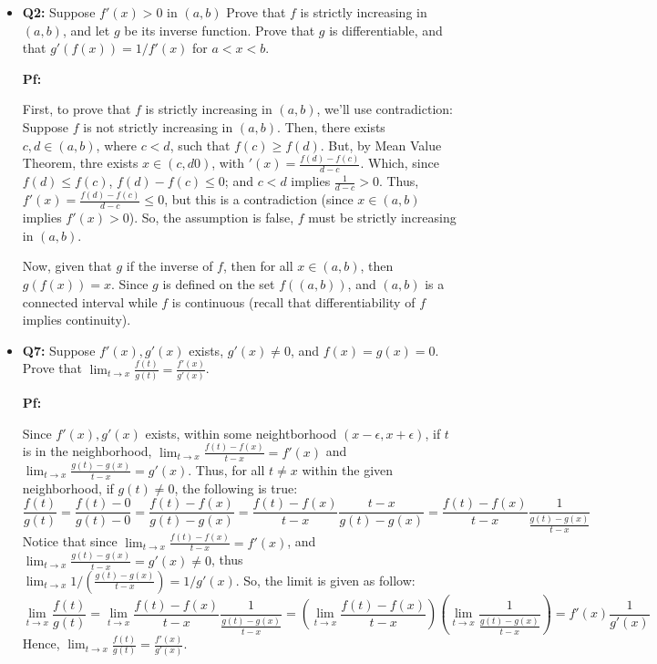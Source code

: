 \documentclass{article}
\begin{document}
\hfill

\begin{itemize}
    \item \begin{myBox}[]{}
        \textbf{Q2:} Suppose $f'(x)>0$ in $(a,b)$ Prove that $f$ is strictly increasing in $(a,b)$, and let $g$ be its inverse function. 
        Prove that $g$ is differentiable, and that $g'(f(x))=1/f'(x)$ for $a<x<b$.
    \end{myBox}

    \textbf{Pf:}

    First, to prove that $f$ is strictly increasing in $(a,b)$, we'll use contradiction: Suppose $f$ is not strictly increasing in $(a,b)$.
    Then, there exists $c,d\in (a,b)$, where $c<d$, such that $f(c)\geq f(d)$. But, by Mean Value Theorem, thre exists $x\in (c,d0)$, with $'(x)=\frac{f(d)-f(c)}{d-c}$.
    Which, since $f(d)\leq f(c)$, $f(d)-f(c)\leq 0$; and $c<d$ implies $\frac{1}{d-c}>0$. Thus, $f'(x)=\frac{f(d)-f(c)}{d-c}\leq 0$, but this is a contradiction (since $x\in (a,b)$ implies $f'(x)>0$).
    So, the assumption is false, $f$ must be strictly increasing in $(a,b)$.

    \hfill

    Now, given that $g$ if the inverse of $f$, then for all $x\in(a,b)$, then $g(f(x))=x$.
    Since $g$ is defined on the set $f((a,b))$, and $(a,b)$ is a connected interval while $f$ is continuous (recall that differentiability of $f$ implies continuity).

    \hfill

    \item \begin{myBox}[]{}
        \textbf{Q7:} Suppose $f'(x), g'(x)$ exists, $g'(x)\neq 0$, and $f(x)=g(x)=0$. Prove that $\lim_{t\rightarrow x}\frac{f(t)}{g(t)}=\frac{f'(x)}{g'(x)}$. 
    \end{myBox}

    \textbf{Pf:}

    Since $f'(x), g'(x)$ exists, within some neightborhood $(x-\epsilon,x+\epsilon)$, if $t$ is in the neighborhood, $\lim_{t\rightarrow x}\frac{f(t)-f(x)}{t-x}=f'(x)$ and $\lim_{t\rightarrow x}\frac{g(t)-g(x)}{t-x}=g'(x)$.
    Thus, for all $t\neq x$ within the given neighborhood, if $g(t)\neq 0$, the following is true:
    $$\frac{f(t)}{g(t)}=\frac{f(t)-0}{g(t)-0}=\frac{f(t)-f(x)}{g(t)-g(x)} = \frac{f(t)-f(x)}{t-x}\frac{t-x}{g(t)-g(x)} = \frac{f(t)-f(x)}{t-x}\frac{1}{\frac{g(t)-g(x)}{t-x}}$$
    Notice that since $\lim_{t\rightarrow x}\frac{f(t)-f(x)}{t-x}=f'(x)$, and $\lim_{t\rightarrow x}\frac{g(t)-g(x)}{t-x}=g'(x)\neq 0$, thus $\lim_{t\rightarrow x}1/\left(\frac{g(t)-g(x)}{t-x}\right)=1/g'(x)$. So, the limit is given as follow:
    $$\lim_{t\rightarrow x}\frac{f(t)}{g(t)}= \lim_{t\rightarrow x}\frac{f(t)-f(x)}{t-x}\frac{1}{\frac{g(t)-g(x)}{t-x}} = \left(\lim_{t\rightarrow x}\frac{f(t)-f(x)}{t-x}\right)\left(\lim_{t\rightarrow x}\frac{1}{\frac{g(t)-g(x)}{t-x}}\right) = f'(x)\frac{1}{g'(x)}$$
    Hence, $\lim_{t\rightarrow x}\frac{f(t)}{g(t)}=\frac{f'(x)}{g'(x)}$.


\end{itemize}
\end{document}
